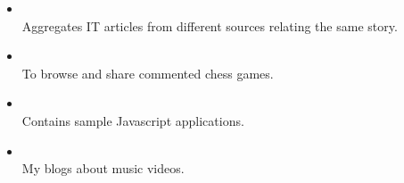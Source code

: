 %
%
%

\twocolumnsection
{
\begin{skills}
\end{skills}}
{
\vspace{1em}
\begin{itemize}
	\item {} \\Aggregates IT articles from different sources relating the same story.  	
	\item {} \\To browse and share commented chess games.
	\item {} \\Contains sample Javascript applications.
	\item {}\\ My blogs about music videos.
\end{itemize}
}
